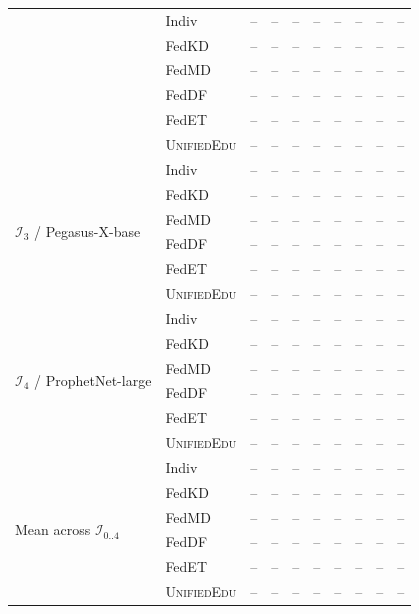 \documentclass[11pt]{article}
\theoremstyle{plain}
\theoremstyle{definition}
\theoremstyle{remark}
\newcommand{\UniEdu}{\textsc{UnifiedEdu}}
\begin{document}
\begin{table}[t]
\begin{tabular}{llcccccccc}
  & Indiv          & -- & -- & -- & -- & -- & -- & -- & -- \\
  & FedKD          & -- & -- & -- & -- & -- & -- & -- & -- \\
  & FedMD          & -- & -- & -- & -- & -- & -- & -- & -- \\
  & FedDF          & -- & -- & -- & -- & -- & -- & -- & -- \\
  & FedET          & -- & -- & -- & -- & -- & -- & -- & -- \\
  & \UniEdu{}      & -- & -- & -- & -- & -- & -- & -- & -- \\
\midrule
\multirow{6}{*}{$\mathcal{I}_3$ / Pegasus-X-base}
  & Indiv          & -- & -- & -- & -- & -- & -- & -- & -- \\
  & FedKD          & -- & -- & -- & -- & -- & -- & -- & -- \\
  & FedMD          & -- & -- & -- & -- & -- & -- & -- & -- \\
  & FedDF          & -- & -- & -- & -- & -- & -- & -- & -- \\
  & FedET          & -- & -- & -- & -- & -- & -- & -- & -- \\
  & \UniEdu{}      & -- & -- & -- & -- & -- & -- & -- & -- \\
\midrule
\multirow{6}{*}{$\mathcal{I}_4$ / ProphetNet-large}
  & Indiv          & -- & -- & -- & -- & -- & -- & -- & -- \\
  & FedKD          & -- & -- & -- & -- & -- & -- & -- & -- \\
  & FedMD          & -- & -- & -- & -- & -- & -- & -- & -- \\
  & FedDF          & -- & -- & -- & -- & -- & -- & -- & -- \\
  & FedET          & -- & -- & -- & -- & -- & -- & -- & -- \\
  & \UniEdu{}      & -- & -- & -- & -- & -- & -- & -- & -- \\
\midrule
\multirow{6}{*}{Mean across $\mathcal{I}_{0..4}$}
  & Indiv          & -- & -- & -- & -- & -- & -- & -- & -- \\
  & FedKD          & -- & -- & -- & -- & -- & -- & -- & -- \\
  & FedMD          & -- & -- & -- & -- & -- & -- & -- & -- \\
  & FedDF          & -- & -- & -- & -- & -- & -- & -- & -- \\
  & FedET          & -- & -- & -- & -- & -- & -- & -- & -- \\
  & \UniEdu{}      & -- & -- & -- & -- & -- & -- & -- & -- \\
\bottomrule
\end{tabular}
\end{table}
\end{document}
